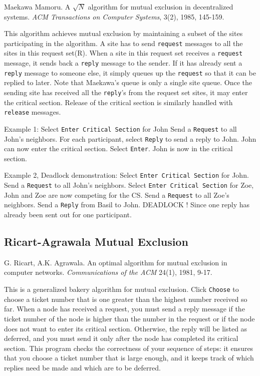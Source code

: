 \documentclass[11pt]{article}
\newcommand{\p}[1]{\texttt{#1}}
\begin{document}
Maekawa Mamoru.
A $\sqrt{N}$ algorithm for mutual exclusion in
decentralized systems.
\emph{ACM Transactions on Computer Systems}, 3(2), 1985, 145-159.

This algorithm achieves mutual exclusion by maintaining a subset
of the sites participating in the algorithm. A site has to send \p{request}
messages to all the sites in this request set(R). When a site in this
request set receives a \p{request} message, it sends back a \p{reply} message
to the sender. If it has already sent a \p{reply} message to someone else,
it simply queues up the \p{request} so that it can be replied to later.
Note that Maekawa's queue is only a single site queue. Once the sending
site has received all the \p{reply}'s from the request set sites, it may
enter the critical section. Release of the critical section is similarly
handled with \p{release} messages.

Example 1:
Select \p{Enter Critical Section} for John
Send a \p{Request} to all John's neighbors.
For each participant, select \p{Reply} to send a reply to John.
John can now enter the critical section. Select \p{Enter}.
John is now in the critical section.

Example 2, Deadlock demonstration:
Select \p{Enter Critical Section} for John.
Send a \p{Request} to all John's neighbors.
Select \p{Enter Critical Section} for Zoe, John and Zoe are now competing for the CS.
Send a \p{Request} to all Zoe's neighbors.
Send a \p{Reply} from Basil to John.
DEADLOCK ! Since one reply has already been sent out for one participant.

\subsection{Ricart-Agrawala Mutual Exclusion}

G. Ricart, A.K. Agrawala.
An optimal algorithm for mutual exclusion
in computer networks.
\emph{Communications of the ACM} 24(1), 1981, 9-17.

This is a generalized bakery algorithm for mutual exclusion.
Click \p{Choose} to choose a ticket number that is one greater
than the highest number received so far.
When a node has received a request, you must send a reply message
if the ticket number of the node is higher than the number in
the request or if the node does not want to enter its critical
section. Otherwise, the reply will be listed as deferred, and
you must send it only after the node has completed its critical
section.
This program checks the correctness of your sequence of steps: it
ensures that you choose a ticket number that is large enough,
and it keeps track of which replies need be made and which are
to be deferred.
\end{document}

